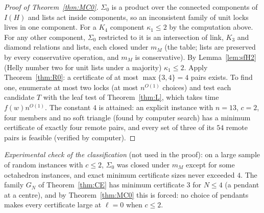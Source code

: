 \begin{proof}[Proof of Theorem~\ref{thm:MC0}]
$\Sigma_0$ is a product over the connected components of $I(H)$ and lists act inside components, so an inconsistent family of unit locks lives in one component. For a $K_4$ component $\kappa_1\le2$ by the computation above. For any other component, $\Sigma_0$ restricted to it is an intersection of link, $K_3$ and diamond relations and lists, each closed under $m_M$ (the table; lists are preserved by every conservative operation, and $m_M$ is conservative). By Lemma~\ref{lem:sfH2} (Helly number two for unit lists under a majority) $\kappa_1\le2$. Apply Theorem~\ref{thm:R0}: a certificate of at most $\max\{3,4\}=4$ pairs exists. To find one, enumerate at most two locks (at most $n^{O(1)}$ choices) and test each candidate $T$ with the leaf test of Theorem~\ref{thm:L}, which takes time $f(w)n^{O(1)}$. The constant $4$ is attained: an explicit instance with $n=13$, $c=2$, four members and no soft triangle (found by computer search) has a minimum certificate of exactly four remote pairs, and every set of three of its $54$ remote pairs is feasible (verified by computer).
\end{proof}
\emph{Experimental check of the classification} (not used in the proof): on a large sample of random instances with $c\le2$, $\Sigma_0$ was closed under $m_M$ except for some octahedron instances, and exact minimum certificate sizes never exceeded $4$. The family $G_N$ of Theorem~\ref{thm:CE} has minimum certificate $3$ for $N\le4$ (a pendant at a centre), and by Theorem~\ref{thm:MC0} this is forced: no choice of pendants makes every certificate large at $\ell=0$ when $c\le2$.

